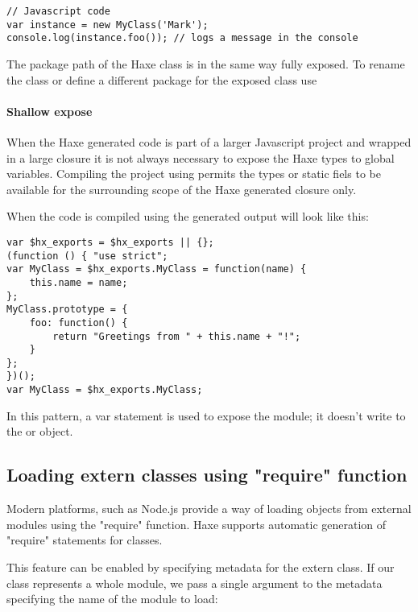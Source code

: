 \begin{lstlisting}
// Javascript code
var instance = new MyClass('Mark');
console.log(instance.foo()); // logs a message in the console
\end{lstlisting}

The package path of the Haxe class is in the same way fully exposed. To rename the class or define a different package for the exposed class use 

\paragraph{Shallow expose}

When the Haxe generated code is part of a larger Javascript project and wrapped in a large closure it is not always necessary to expose the Haxe types to global variables.
Compiling the project using  permits the types or static fiels to be available for the surrounding scope of the Haxe generated closure only.

When the code is compiled using  the generated output will look like this:

\begin{lstlisting}
var $hx_exports = $hx_exports || {};
(function () { "use strict";
var MyClass = $hx_exports.MyClass = function(name) {
	this.name = name;
};
MyClass.prototype = {
	foo: function() {
		return "Greetings from " + this.name + "!";
	}
};
})();
var MyClass = $hx_exports.MyClass;
\end{lstlisting}

In this pattern, a var statement is used to expose the module; it doesn't write to the  or  object. 

\subsection{Loading extern classes using "require" function}
\label{target-javascript-require}

Modern  platforms, such as Node.js provide a way of loading objects
from external modules using the "require" function. Haxe supports automatic generation
of "require" statements for  classes.

This feature can be enabled by specifying  metadata for the extern class. If our  class represents a whole module, we pass a single argument to the  metadata specifying the name of the module to load:


